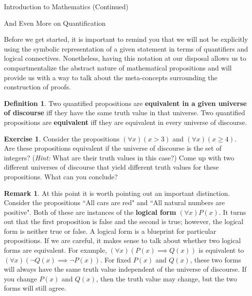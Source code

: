 \documentclass[11pt]{article}
\theoremstyle{definition}
\newtheorem{definition}[theorem]{Definition}
\newtheorem{exercise}[theorem]{Exercise}
\newtheorem{remark}[theorem]{Remark}
\begin{document}
\addtocounter{section}{0}

\begin{section}{Introduction to Mathematics (Continued)}

\addtocounter{subsection}{5}
\addtocounter{theorem}{79}


\begin{subsection}{And Even More on Quantification}

Before we get started, it is important to remind you that we will not be explicitly using the symbolic representation of a given statement in terms of quantifiers and logical connectives.  Nonetheless, having this notation at our disposal allows us to compartmentalize the abstract nature of mathematical propositions and will provide us with a way to talk about the meta-concepts surrounding the construction of proofs.

\begin{definition}
Two quantified propositions are \textbf{equivalent in a given universe of discourse} iff they have the same truth value in that universe.  Two quantified propositions are \textbf{equivalent} iff they are equivalent in every universe of discourse.
\end{definition}

\begin{exercise}
Consider the propositions $(\forall x)(x>3)$ and $(\forall x)(x\geq 4)$.  Are these propositions equivalent if the universe of discourse is the set of integers?  (\emph{Hint:}  What are their truth values in this case?)  Come up with two different universes of discourse that yield different truth values for these propositions.  What can you conclude?
\end{exercise}

\begin{remark}
At this point it is worth pointing out an important distinction.  Consider the propositions ``All cars are red" and ``All natural numbers are positive".  Both of these are instances of the \textbf{logical form} $(\forall x)P(x)$.  It turns out that the first proposition is false and the second is true; however, the logical form is neither true or false.  A logical form is a blueprint for particular propositions.  If we are careful, it makes sense to talk about whether two logical forms are equivalent.  For example, $(\forall x)(P(x)\implies Q(x))$ is equivalent to $(\forall x)(\neg Q(x)\implies \neg P(x))$.  For fixed $P(x)$ and $Q(x)$, these two forms will always have the same truth value independent of the universe of discourse.  If you change $P(x)$ and $Q(x)$, then the truth value may change, but the two forms will still agree.
\end{remark}


\end{subsection}
\end{section}
\end{document}
